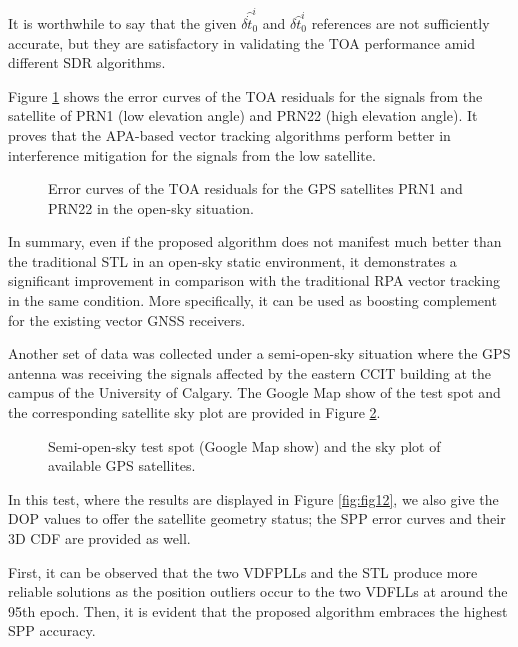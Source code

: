 \documentclass{article}
\newcommand{\reffig}[1]{Figure \ref{#1}}
\begin{document}
It is worthwhile to say that the given $\delta {\hat{\dot{t}}}^i_0$ and $\delta {\hat{t}}^i_0$ references are not sufficiently accurate, but they are satisfactory in validating the TOA performance amid different SDR algorithms. 

\reffig{fig:fig10} shows the error curves of the TOA residuals for the signals from the satellite of PRN1 (low elevation angle) and PRN22 (high elevation angle). It proves that the APA-based vector tracking algorithms perform better in interference mitigation for the signals from the low satellite. 

\begin{figure}[htbp]%
\centering
{}%
\hfil
{}%
\hfil
{}%
\hfil
{}%
\caption{Error curves of the TOA residuals for the GPS satellites PRN1 and PRN22 in the open-sky situation. }%
\label{fig:fig10}%
\end{figure}

In summary, even if the proposed algorithm does not manifest much better than the traditional STL in an open-sky static environment, it demonstrates a significant improvement in comparison with the traditional RPA vector tracking in the same condition. More specifically, it can be used as boosting complement for the existing vector GNSS receivers. 

Another set of data was collected under a semi-open-sky situation where the GPS antenna was receiving the signals affected by the eastern CCIT building at the campus of the University of Calgary. The Google Map show of the test spot and the corresponding satellite sky plot are provided in \reffig{fig:fig11}. 

\begin{figure}[htbp]%
\centering
{}%
\hfil
{}%
\caption{Semi-open-sky test spot (Google Map show) and the sky plot of available GPS satellites. }%
\label{fig:fig11}%
\end{figure}

In this test, where the results are displayed in \reffig{fig:fig12}, we also give the DOP values to offer the satellite geometry status; the SPP error curves and their 3D CDF are provided as well. 

First, it can be observed that the two VDFPLLs and the STL produce more reliable solutions as the position outliers occur to the two VDFLLs at around the 95th epoch. Then, it is evident that the proposed algorithm embraces the highest SPP accuracy. 
\end{document}
